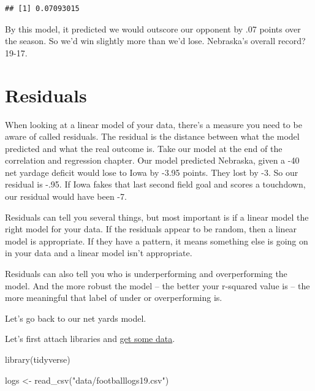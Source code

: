 \documentclass[
]{book}
\newenvironment{Shaded}{\begin{snugshade}}{\end{snugshade}}
\newcommand{\FunctionTok}[1]{\textcolor[rgb]{0.00,0.00,0.00}{#1}}
\newcommand{\NormalTok}[1]{#1}
\newcommand{\OtherTok}[1]{\textcolor[rgb]{0.56,0.35,0.01}{#1}}
\newcommand{\StringTok}[1]{\textcolor[rgb]{0.31,0.60,0.02}{#1}}
\begin{document}
\begin{verbatim}
## [1] 0.07093015
\end{verbatim}

By this model, it predicted we would outscore our opponent by .07 points over the season. So we'd win slightly more than we'd lose. Nebraska's overall record? 19-17.

\hypertarget{residuals}{%
\chapter{Residuals}\label{residuals}}

When looking at a linear model of your data, there's a measure you need to be aware of called residuals. The residual is the distance between what the model predicted and what the real outcome is. Take our model at the end of the correlation and regression chapter. Our model predicted Nebraska, given a -40 net yardage deficit would lose to Iowa by -3.95 points. They lost by -3. So our residual is -.95. If Iowa fakes that last second field goal and scores a touchdown, our residual would have been -7.

Residuals can tell you several things, but most important is if a linear model the right model for your data. If the residuals appear to be random, then a linear model is appropriate. If they have a pattern, it means something else is going on in your data and a linear model isn't appropriate.

Residuals can also tell you who is underperforming and overperforming the model. And the more robust the model -- the better your r-squared value is -- the more meaningful that label of under or overperforming is.

Let's go back to our net yards model.

Let's first attach libraries and \href{https://unl.box.com/s/2prgq48ctoxlukn6kmfjw0u1opda5s0m}{get some data}.

\begin{Shaded}
\begin{Highlighting}[]
\FunctionTok{library}\NormalTok{(tidyverse)}
\end{Highlighting}
\end{Shaded}

\begin{Shaded}
\begin{Highlighting}[]
\NormalTok{logs }\OtherTok{\textless{}{-}} \FunctionTok{read\_csv}\NormalTok{(}\StringTok{"data/footballlogs19.csv"}\NormalTok{)}
\end{Highlighting}
\end{Shaded}
\end{document}
